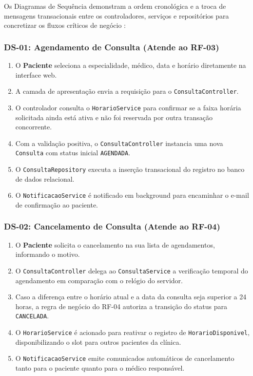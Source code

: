 Os Diagramas de Sequência demonstram a ordem cronológica e a troca de mensagens transacionais entre os controladores, serviços e repositórios para concretizar os fluxos críticos de negócio \cite{booch2005}:

\subsubsection{DS-01: Agendamento de Consulta (Atende ao RF-03)}
\begin{enumerate}
    \item O \textbf{Paciente} seleciona a especialidade, médico, data e horário diretamente na interface web.
    \item A camada de apresentação envia a requisição para o \texttt{ConsultaController}.
    \item O controlador consulta o \texttt{HorarioService} para confirmar se a faixa horária solicitada ainda está ativa e não foi reservada por outra transação concorrente.
    \item Com a validação positiva, o \texttt{ConsultaController} instancia uma nova \texttt{Consulta} com status inicial \texttt{AGENDADA}.
    \item O \texttt{ConsultaRepository} executa a inserção transacional do registro no banco de dados relacional.
    \item O \texttt{NotificacaoService} é notificado em background para encaminhar o e-mail de confirmação ao paciente.
\end{enumerate}

\subsubsection{DS-02: Cancelamento de Consulta (Atende ao RF-04)}
\begin{enumerate}
    \item O \textbf{Paciente} solicita o cancelamento na sua lista de agendamentos, informando o motivo.
    \item O \texttt{ConsultaController} delega ao \texttt{ConsultaService} a verificação temporal do agendamento em comparação com o relógio do servidor.
    \item Caso a diferença entre o horário atual e a data da consulta seja superior a 24 horas, a regra de negócio do RF-04 autoriza a transição do status para \texttt{CANCELADA}.
    \item O \texttt{HorarioService} é acionado para reativar o registro de \texttt{HorarioDisponivel}, disponibilizando o slot para outros pacientes da clínica.
    \item O \texttt{NotificacaoService} emite comunicados automáticos de cancelamento tanto para o paciente quanto para o médico responsável.
\end{enumerate}

